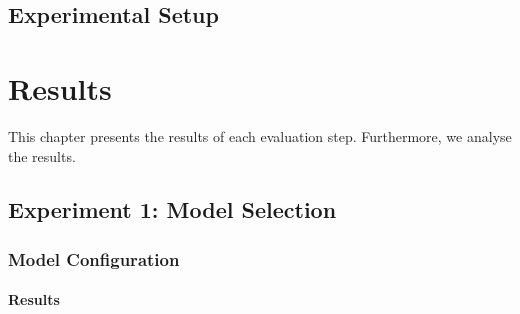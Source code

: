 \documentclass[12pt,a4paper]{report}
\begin{document}
\section{Experimental Setup}
\label{sec:experimental_setup}







\chapter{Results}
\label{ch:results}
This chapter presents the results of each evaluation step. Furthermore, we analyse the results.


% 

% 



% 
% 
% 
\section{Experiment 1: Model Selection}
\subsection{Model Configuration}
\subsubsection{Results}

\end{document}
